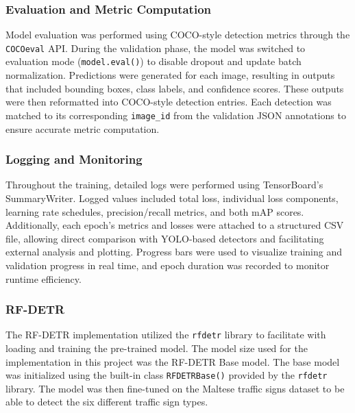 \documentclass{article}
\begin{document}
\subsubsection*{Evaluation and Metric Computation}
Model evaluation was performed using COCO-style detection metrics through the \texttt{COCOeval} API. During the validation phase, the model was switched to evaluation mode (\texttt{model.eval()}) to disable dropout and update batch normalization. Predictions were generated for each image, resulting in outputs that included bounding boxes, class labels, and confidence scores. These outputs were then reformatted into COCO-style detection entries. Each detection was matched to its corresponding \texttt{image\_id} from the validation JSON annotations to ensure accurate metric computation.

\subsubsection*{Logging and Monitoring}
Throughout the training, detailed logs were performed using TensorBoard's SummaryWriter. Logged values included total loss, individual loss components, learning rate schedules, precision/recall metrics, and both mAP scores. Additionally, each epoch's metrics and losses were attached to a structured CSV file, allowing direct comparison with YOLO-based detectors and facilitating external analysis and plotting. Progress bars were used to visualize training and validation progress in real time, and epoch duration was recorded to monitor runtime efficiency.

\subsubsection{RF-DETR}

The RF-DETR implementation utilized the \verb|rfdetr| library to facilitate with loading and training the pre-trained model. The model size used for the implementation in this project was the RF-DETR Base model. The base model was initialized using the built-in class \verb|RFDETRBase()| provided by the \verb|rfdetr| library. The model was then fine-tuned on the Maltese traffic signs dataset to be able to detect the six different traffic sign types.
\end{document}
